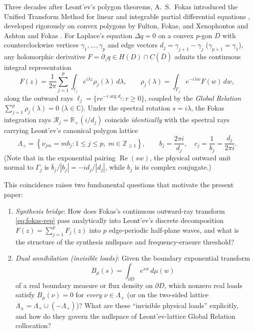 \documentclass[11pt,reqno]{amsart}
\theoremstyle{definition}
\theoremstyle{remark}
\newcommand{\C}{\mathbb{C}}
\newcommand{\R}{\mathbb{R}}
\newcommand{\Z}{\mathbb{Z}}
\begin{document}
Three decades after Leont'ev's polygon theorems, A.~S.~Fokas introduced the Unified Transform Method for linear and integrable partial differential equations \cite{FokasBook2008}, developed rigorously on convex polygons by Fulton, Fokas, and Xenophontos \cite{FFX2004} and Ashton and Fokas \cite{Ashton2012,AshtonFokas2013}. For Laplace's equation $\Delta q = 0$ on a convex $p$-gon $D$ with counterclockwise vertices $\gamma_1, \dots, \gamma_p$ and edge vectors $d_j = \gamma_{j+1}-\gamma_j$ ($\gamma_{p+1}=\gamma_1$), any holomorphic derivative $F = \partial_z q \in H(D) \cap C(\bar D)$ admits the continuous integral representation
\begin{equation}\label{eq:fokas-rep}
  F(z) = \frac{1}{2\pi} \sum_{j=1}^p \int_{\ell_j} e^{i\lambda z} \rho_j(\lambda)\,d\lambda,
  \qquad \rho_j(\lambda) = \int_{\Gamma_j} e^{-i\lambda w} F(w)\,dw,
\end{equation}
along the outward rays $\ell_j = \{r e^{-i\arg d_j} : r \ge 0\}$, coupled by the \emph{Global Relation} $\sum_{j=1}^p \rho_j(\lambda) = 0$ ($\lambda \in \C$). Under the spectral rotation $s = i\lambda$, the Fokas integration rays $\mathcal{R}_j = \R_+(i/d_j)$ coincide \emph{identically} with the spectral rays carrying Leont'ev's canonical polygon lattice
\begin{equation}\label{eq:lattice-def}
  \Lambda_+ = \left\{ \nu_{jm} = m b_j : 1 \le j \le p,\; m \in \Z_{\ge 1} \right\},
  \qquad b_j = \frac{2\pi i}{d_j}, \quad c_j = \frac{1}{b_j} = \frac{d_j}{2\pi i}.
\end{equation}
(Note that in the exponential pairing $\operatorname{Re}(sw)$, the physical outward unit normal to $\Gamma_j$ is $\bar b_j/|b_j| = -i d_j/|d_j|$, while $b_j$ is its complex conjugate.)

This coincidence raises two fundamental questions that motivate the present paper:
\begin{enumerate}
  \item \emph{Synthesis bridge}: How does Fokas's continuous outward-ray transform \eqref{eq:fokas-rep} pass analytically into Leont'ev's discrete decomposition $F(z) = \sum_{j=1}^p F_j(z)$ into $p$ edge-periodic half-plane waves, and what is the structure of the synthesis nullspace and frequency-erasure threshold?
  \item \emph{Dual annihilation (invisible loads)}: Given the boundary exponential transform
  \begin{equation}\label{eq:B-def}
    B_\mu(s) = \int_{\partial D} e^{sw}\,d\mu(w)
  \end{equation}
  of a real boundary measure or flux density on $\partial D$, which nonzero real loads satisfy $B_\mu(\nu) = 0$ for \emph{every} $\nu \in \Lambda_+$ (or on the two-sided lattice $\Lambda_\pm = \Lambda_+ \cup (-\Lambda_+)$)? What are these ``invisible physical loads'' explicitly, and how do they govern the nullspace of Leont'ev-lattice Global Relation collocation?
\end{enumerate}
\end{document}
